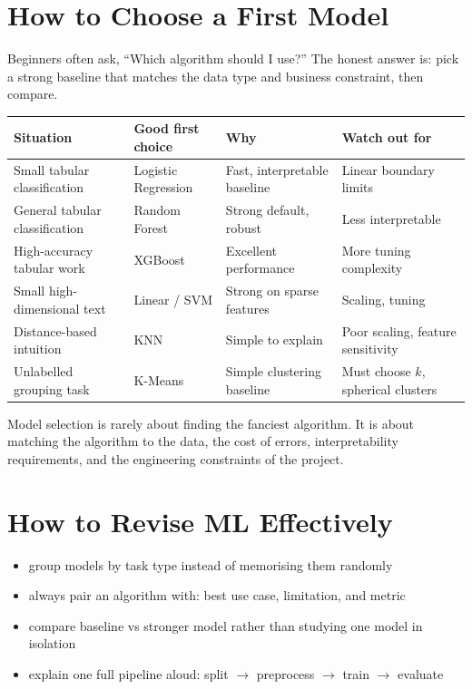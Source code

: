\documentclass[12pt, a4paper, oneside]{book}
\begin{document}
\section{How to Choose a First Model}

Beginners often ask, ``Which algorithm should I use?'' The honest answer is: pick a strong baseline that matches the data type and business constraint, then compare.

\begin{center}
\begin{tabular}{l l l l}
\toprule
\textbf{Situation} & \textbf{Good first choice} & \textbf{Why} & \textbf{Watch out for} \\
\midrule
Small tabular classification & Logistic Regression & Fast, interpretable baseline & Linear boundary limits \\
General tabular classification & Random Forest & Strong default, robust & Less interpretable \\
High-accuracy tabular work & XGBoost & Excellent performance & More tuning complexity \\
Small high-dimensional text & Linear / SVM & Strong on sparse features & Scaling, tuning \\
Distance-based intuition & KNN & Simple to explain & Poor scaling, feature sensitivity \\
Unlabelled grouping task & K-Means & Simple clustering baseline & Must choose \(k\), spherical clusters \\
\bottomrule
\end{tabular}
\end{center}

\begin{intuitionbox}
Model selection is rarely about finding the fanciest algorithm. It is about matching the algorithm to the data, the cost of errors, interpretability requirements, and the engineering constraints of the project.
\end{intuitionbox}

\section{How to Revise ML Effectively}

\begin{itemize}[leftmargin=2em]
    \item group models by task type instead of memorising them randomly
    \item always pair an algorithm with: best use case, limitation, and metric
    \item compare baseline vs stronger model rather than studying one model in isolation
    \item explain one full pipeline aloud: split $\to$ preprocess $\to$ train $\to$ evaluate
\end{itemize}
\end{document}
